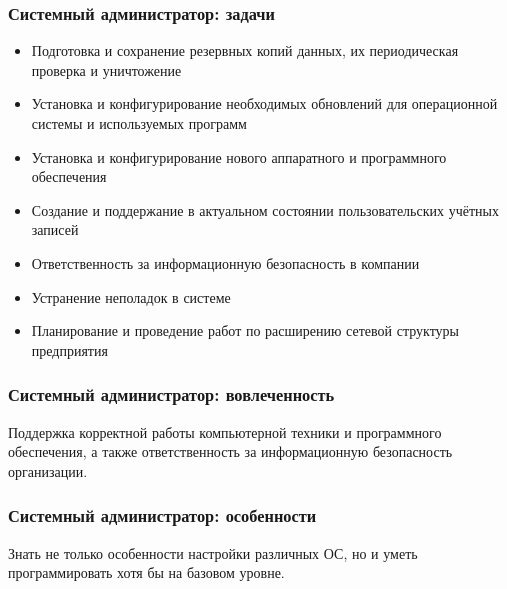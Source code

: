 \documentclass{../industrial-development}
\begin{document}
	\begin{frame} \frametitle{Системный администратор: задачи}
		\begin{itemize}
			\item Подготовка и сохранение резервных копий данных, их периодическая проверка и уничтожение
			\item Установка и конфигурирование необходимых обновлений для операционной системы и используемых программ
			\item Установка и конфигурирование нового аппаратного и программного обеспечения
			\item Создание и поддержание в актуальном состоянии пользовательских учётных записей
			\item Ответственность за информационную безопасность в компании
			\item Устранение неполадок в системе
			\item Планирование и проведение работ по расширению сетевой структуры предприятия
		\end{itemize}
	\end{frame}
	\begin{frame} \frametitle{Системный администратор: вовлеченность}
		Поддержка корректной работы компьютерной техники и программного обеспечения, а также ответственность за информационную безопасность организации.
	\end{frame}
	
	\begin{frame} \frametitle{Системный администратор: особенности}
		Знать не только особенности настройки различных ОС, но и уметь программировать хотя бы на базовом уровне.
	\end{frame}
	
\end{document}
